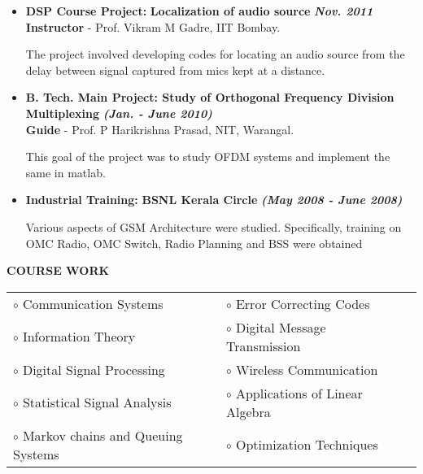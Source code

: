 \documentclass[a4paper,10pt]{article}
\begin{document}
\begin{itemize}
 \item \textbf{DSP Course Project:} \textbf{Localization of audio source} \textbf \emph{Nov. 2011}\\
	{\textbf{Instructor} - Prof. Vikram M Gadre, IIT Bombay. }
	
	The project involved developing codes for locating an audio source from the delay between signal captured from 
	mics kept at a distance.

  \item \textbf{{B. Tech. Main Project}: Study of Orthogonal Frequency Division Multiplexing}  \textbf \emph{(Jan. - June 2010)}\\
        {\textbf{Guide} - Prof. P Harikrishna Prasad, NIT, Warangal. }

This goal of the project was to study OFDM systems and implement the same in matlab.

  \item \textbf{Industrial Training:} \textbf{BSNL Kerala Circle}  \textbf \emph{(May 2008 - June 2008)}
  
  Various aspects of GSM Architecture were studied. Specifically, training on OMC Radio, OMC Switch, Radio Planning and BSS were 
  obtained

 \end{itemize}
 
 \colorbox{titleColor}{\parbox{6.5in}{\textbf{COURSE WORK}}}

 \begin{tabular}{p{3.5in}p{5in}p{3.5in}}
     $\circ$ Communication Systems		&$\circ$ Error Correcting Codes \\
    $\circ$ Information Theory			&$\circ$ Digital Message Transmission \\
    $\circ$ Digital Signal Processing		&$\circ$ Wireless Communication \\
    $\circ$ Statistical Signal Analysis	&$\circ$ Applications of Linear Algebra \\
    $\circ$ Markov chains and Queuing Systems	&$\circ$ Optimization Techniques \\
    
    \end{tabular}
    
\end{document}
